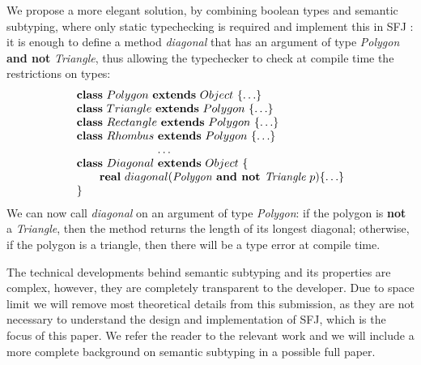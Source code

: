 \documentclass[runningheads]{llncs}
\begin{document}
\begin{example}[Polygons]
We propose a more elegant solution, by combining boolean types and semantic subtyping, where only static typechecking is required and implement this in SFJ \cite{UD20}: it is enough to define a method \emph{diagonal} that has an argument of type \emph{Polygon} \textbf{and not} \emph{Triangle}, thus allowing the typechecker to check at compile time the restrictions on types:
$$
\begin{array}{l}
\mathbf{class} \  Polygon \ \mathbf{extends }\  Object\ \{\ldots\}
\\
\mathbf{class} \  Triangle \ \mathbf{extends }\  Polygon\ \{\ldots\}
\\
\mathbf{class} \  Rectangle \ \mathbf{extends }\  Polygon\ \{\ldots\}
\\
\mathbf{class} \  Rhombus \ \mathbf{extends }\  Polygon\ \{\ldots\}
\\
\hspace{2.5cm} \ldots
\\
\mathbf{class} \  Diagonal \ \mathbf{extends }\  Object\ \{
	\\
	\qquad \mathbf{real}\ diagonal(\textit{Polygon} \textbf{ and not }  \textit{Triangle} \ p)\{\ldots\}
	\\
\}
\end{array}
$$
We can now call \emph{diagonal} on an argument of type \emph{Polygon}: if the polygon is \textbf{not} a \emph{Triangle}, then the method returns the length of its longest diagonal; otherwise, if the polygon is a triangle, then there will be a type error at compile time.
\end{example}

The technical developments behind semantic subtyping and its properties are complex, however, they are completely transparent to the developer.
Due to space limit we will remove most theoretical details from this submission, as they are not necessary to understand the design and implementation of SFJ, which is the focus of this paper. We refer the reader to the relevant work \cite{Dardha2013,Dardha2017} and we will include a more complete background on semantic subtyping in a possible full paper.
\end{document}

